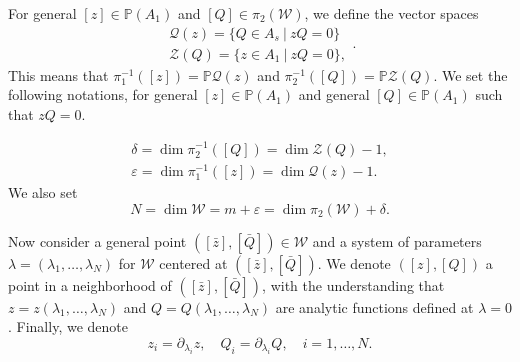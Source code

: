 \documentclass[10pt, a4paper]{amsart}
\theoremstyle{plain}
\theoremstyle{definition}
\theoremstyle{remark}
\def\PP{\mathbb{P}}
\begin{document}
 For general $[z]\in \PP(A_1)$ and $[Q]\in \pi_2(\mathcal{W})$, we define the vector spaces
 $$\begin{array}{c}\mathcal{Q}(z)=\{Q\in A_s\ |\ zQ=0\}\\
 \mathcal{Z}(Q)=\{z\in A_1\ |\ zQ=0\},\end{array}.$$
 This means that  $\pi_1^{-1}([z])=\PP\mathcal{Q}(z)$ and $\pi_2^{-1}([Q])=\PP\mathcal{Z}(Q)$.
We set the following notations, for general $[z]\in \PP(A_1)$ and general $[Q]\in\PP(A_1)$ such that $zQ=0$.

\begin{equation}\label{eq:deltaepsilon}
\begin{array}{c} \delta=\dim\pi_2^{-1}([Q])=\dim\mathcal{Z}(Q)-1,\\ \varepsilon=\dim\pi_1^{-1}([z])=\dim\mathcal{Q}(z)-1 .
\end{array}
\end{equation}
We also set \begin{equation}\label{eq:dimW}
N=\dim\mathcal{W}=m+\varepsilon=\dim\pi_2(\mathcal{W})+\delta.\end{equation}

Now consider a general point $([\bar{z}],[\bar{Q}])\in\mathcal{W}$ and a system of parameters $\lambda=(\lambda_1,\ldots,\lambda_N)$ for $\mathcal{W}$ centered at $([\bar{z}],[\bar{Q}])$. We denote $([z],[Q])$ a point in a neighborhood of $([\bar{z}],[\bar{Q}])$, with the understanding that $z=z(\lambda_1,\ldots,\lambda_N)$ and $Q=Q(\lambda_1,\ldots,\lambda_N)$ are analytic functions defined at $\lambda=0$. Finally, we denote
$$z_i=\partial_{\lambda_i}z,\quad Q_i=\partial_{\lambda_i}Q, \quad i=1,\dots,N.$$
 
\end{document}
